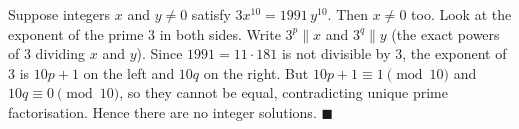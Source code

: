 Suppose integers $x$ and $y\ne0$ satisfy $3x^{10}=1991\,y^{10}$. Then $x\ne0$ too. Look at the exponent of the prime $3$ in both sides. Write $3^p\parallel x$ and $3^q\parallel y$ (the exact powers of $3$ dividing $x$ and $y$). Since $1991=11\cdot181$ is not divisible by $3$, the exponent of $3$ is $10p+1$ on the left and $10q$ on the right. But $10p+1\equiv1\pmod{10}$ and $10q\equiv0\pmod{10}$, so they cannot be equal, contradicting unique prime factorisation. Hence there are no integer solutions. $\blacksquare$
